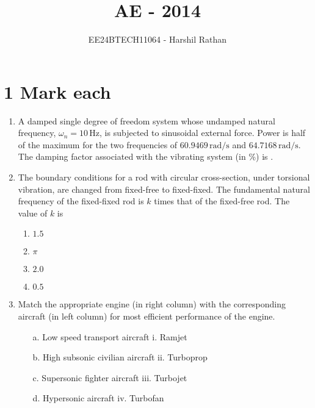 \documentclass[journal]{IEEEtran}
\begin{document}

\vspace{3cm}

\title{AE - 2014}
\author{EE24BTECH11064 - Harshil Rathan}
\maketitle

\renewcommand{\thefigure}{\theenumi}
\renewcommand{\thetable}{\theenumi}

\section*{1 Mark each}
\begin{enumerate}
\item A damped single degree of freedom system whose undamped natural frequency, $\omega_n = 10 \, \text{Hz}$, is subjected to sinusoidal external force. Power is half of the maximum for the two frequencies of $60.9469 \, \text{rad/s}$ and $64.7168 \, \text{rad/s}$. The damping factor associated with the vibrating system (in \%) is \underline{\hspace{4cm}}.
\vspace{0.5cm}
\item The boundary conditions for a rod with circular cross-section, under torsional vibration, are changed from fixed-free to fixed-fixed. The fundamental natural frequency of the fixed-fixed rod is \(k\) times that of the fixed-free rod. The value of \(k\) is
\begin{multicols}{2}
\begin{enumerate}
      \item $1.5$
        \item $\pi$
        \item $2.0$
        \item $0.5$
\end{enumerate}
\end{multicols}
\vspace{0.5cm}
\item Match the appropriate engine (in right column) with the corresponding aircraft (in left column) for most efficient performance of the engine.

\begin{itemize}
    \item[a.] Low speed transport aircraft \hspace{3cm} i. Ramjet
    \item[b.] High subsonic civilian aircraft \hspace{2.8cm} ii. Turboprop
    \item[c.] Supersonic fighter aircraft \hspace{3cm} iii. Turbojet
    \item[d.] Hypersonic aircraft \hspace{4.4cm} iv. Turbofan
\end{itemize}


\end{enumerate}
\end{document}
